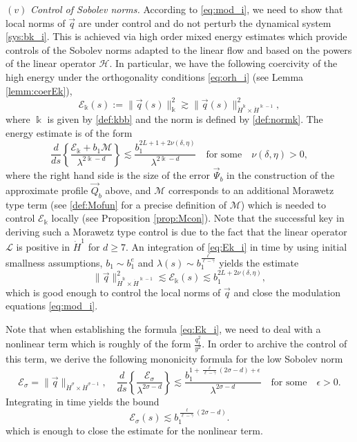 \documentclass[11pt]{aims}
\theoremstyle{definition}
\numberwithin{equation}{section}
\begin{document}
\noindent $(v)$ \textit{Control of Sobolev norms.} According to \eqref{eq:mod_i}, we need to show that local norms of $\vec{q}$ are under control and do not perturb the dynamical system \eqref{sys:bk_i}. This is achieved via high order mixed energy estimates which provide controls of the Sobolev norms adapted to the linear flow and based on the powers of the linear operator ${\mathscr{H}}$. In particular, we have the following coercivity of the high energy under the orthogonality conditions \eqref{eq:orh_i} (see Lemma \ref{lemm:coerEk}),
$${\mathscr{E}}_{\Bbbk}(s) := \|\vec q(s)\|_{\Bbbk}^2  \gtrsim \|\vec q(s) \|^2_{\dot H^\Bbbk \times \dot H^{\Bbbk - 1}},$$
where $\Bbbk$ is given by \eqref{def:kbb} and the norm is defined by \eqref{def:normk}. The energy estimate is of the form 
\begin{equation}\label{eq:Ek_i}
\frac{d}{ds} \left\{\frac{{\mathscr{E}}_{\Bbbk} + b_1{\mathcal{M}} }{\lambda^{2\Bbbk - d}}\right\} \lesssim \frac{b_1^{2L + 1 + 2\nu(\delta, \eta)}}{\lambda^{2\Bbbk - d}} \quad \text{for some}\quad \nu(\delta, \eta) > 0,
\end{equation}
where the right hand side is the size of the error $\vec \Psi_b$ in the construction of the approximate profile $\vec Q_b$ above, and ${\mathcal{M}}$ corresponds to an additional Morawetz type term (see \eqref{def:Mofun} for a precise definition of ${\mathcal{M}}$) which is needed to control ${\mathscr{E}}_{\Bbbk}$ locally (see Proposition \ref{prop:Mcon}). Note that the successful key in deriving such a Morawetz type control is due to the fact that the linear operator ${\mathscr{L}}$ is positive in $\dot{H}^1$ for $d \geq 7$.   An integration of \eqref{eq:Ek_i} in time by using initial smallness assumptions, $b_1 \sim b_1^e$ and $\lambda(s) \sim b_1^{\frac{\ell}{\ell - \gamma}}$ yields the estimate
$$
\|\vec q \|^2_{\dot H^\Bbbk \times \dot H^{\Bbbk - 1}} \lesssim {\mathscr{E}}_{\Bbbk}(s) \lesssim b_1^{2L + 2\nu(\delta, \eta)},$$
which is good enough to control the local norms of $\vec q$ and close the modulation equations \eqref{eq:mod_i}.

Note that when establishing the formula \eqref{eq:Ek_i}, we need to deal with a nonlinear term which is roughly of the form $\frac{q_1^2}{y^2}$. In order to archive the control of this term, we derive the following mononicity formula for the low Sobolev norm
$${\mathscr{E}}_\sigma = \|\vec q\|_{\dot{H}^\sigma \times \dot{H}^{\sigma - 1}}, \quad \frac{d}{ds}\left\{\frac{{\mathscr{E}}_\sigma}{\lambda^{2\sigma - d}} \right\} \lesssim \frac{b_1^{1 + \frac{\ell}{\ell -\gamma}\left(2\sigma - d \right) + \epsilon}}{\lambda^{2\sigma - d}} \quad \text{for some} \quad \epsilon > 0.$$
Integrating in time yields the bound 
$${\mathscr{E}}_\sigma(s) \lesssim b_1^{\frac{\ell}{\ell - \gamma}(2\sigma - d)}.$$
which is enough to close the estimate for the nonlinear term.
\end{document}

